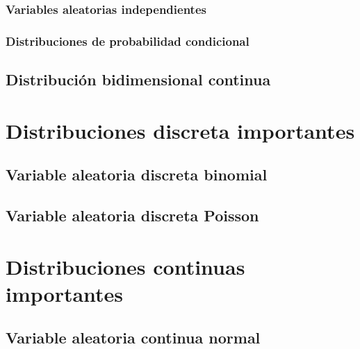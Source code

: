 \documentclass[10pt,]{krantz}
\theoremstyle{definition}
\theoremstyle{definition}
\theoremstyle{definition}
\theoremstyle{remark}
\begin{document}
\hypertarget{variables-aleatorias-independientes}{%
\subsection{Variables aleatorias independientes}\label{variables-aleatorias-independientes}}

\hypertarget{distribuciones-de-probabilidad-condicional}{%
\subsection{Distribuciones de probabilidad condicional}\label{distribuciones-de-probabilidad-condicional}}

\hypertarget{distribuciuxf3n-bidimensional-continua}{%
\section{Distribución bidimensional continua}\label{distribuciuxf3n-bidimensional-continua}}

\hypertarget{distribuciones-discreta-importantes}{%
\chapter{Distribuciones discreta importantes}\label{distribuciones-discreta-importantes}}

\hypertarget{variable-aleatoria-discreta-binomial}{%
\section{Variable aleatoria discreta binomial}\label{variable-aleatoria-discreta-binomial}}

\hypertarget{variable-aleatoria-discreta-poisson}{%
\section{Variable aleatoria discreta Poisson}\label{variable-aleatoria-discreta-poisson}}

\hypertarget{distribuciones-continuas-importantes}{%
\chapter{Distribuciones continuas importantes}\label{distribuciones-continuas-importantes}}

\hypertarget{variable-aleatoria-continua-normal}{%
\section{Variable aleatoria continua normal}\label{variable-aleatoria-continua-normal}}
\end{document}
